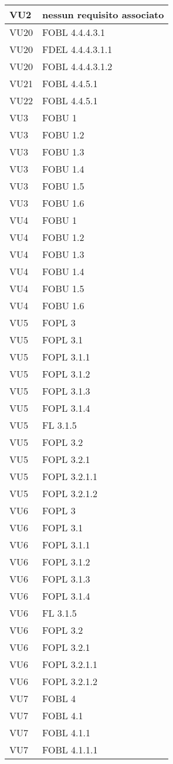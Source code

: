 \begin{longtable}{XX}
\midrule 
VU2&nessun requisito associato\\ 
\midrule 
VU20&FOBL 4.4.4.3.1\\ 
VU20&FDEL 4.4.4.3.1.1\\ 
VU20&FOBL 4.4.4.3.1.2\\ 
\midrule 
VU21&FOBL 4.4.5.1\\ 
\midrule 
VU22&FOBL 4.4.5.1\\ 
\midrule 
VU3&FOBU 1\\ 
VU3&FOBU 1.2\\ 
VU3&FOBU 1.3\\ 
VU3&FOBU 1.4\\ 
VU3&FOBU 1.5\\ 
VU3&FOBU 1.6\\ 
\midrule 
VU4&FOBU 1\\ 
VU4&FOBU 1.2\\ 
VU4&FOBU 1.3\\ 
VU4&FOBU 1.4\\ 
VU4&FOBU 1.5\\ 
VU4&FOBU 1.6\\ 
\midrule 
VU5&FOPL 3\\ 
VU5&FOPL 3.1\\ 
VU5&FOPL 3.1.1\\ 
VU5&FOPL 3.1.2\\ 
VU5&FOPL 3.1.3\\ 
VU5&FOPL 3.1.4\\ 
VU5&FL 3.1.5\\ 
VU5&FOPL 3.2\\ 
VU5&FOPL 3.2.1\\ 
VU5&FOPL 3.2.1.1\\ 
VU5&FOPL 3.2.1.2\\ 
\midrule 
VU6&FOPL 3\\ 
VU6&FOPL 3.1\\ 
VU6&FOPL 3.1.1\\ 
VU6&FOPL 3.1.2\\ 
VU6&FOPL 3.1.3\\ 
VU6&FOPL 3.1.4\\ 
VU6&FL 3.1.5\\ 
VU6&FOPL 3.2\\ 
VU6&FOPL 3.2.1\\ 
VU6&FOPL 3.2.1.1\\ 
VU6&FOPL 3.2.1.2\\ 
\midrule 
VU7&FOBL 4\\ 
VU7&FOBL 4.1\\ 
VU7&FOBL 4.1.1\\ 
VU7&FOBL 4.1.1.1\\ 

\end{longtable}
